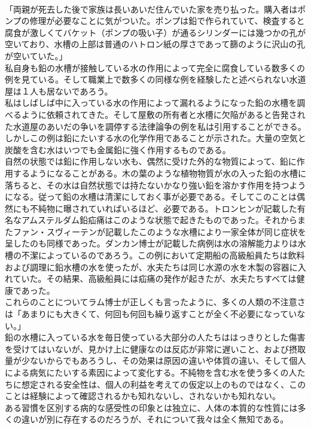 \documentclass[8pt]{extreport}
\begin{document}
\begin{CJK}{UTF8}{min}
\\	「両親が死去した後で家族は長いあいだ住んでいた家を売り払った。購入者はポンプの修理が必要なことに気がついた。ポンプは鉛で作られていて、検査すると腐食が激しくてバケット（ポンプの吸い子）が通るシリンダーには幾つかの孔が空いており、水槽の上部は普通のハトロン紙の厚さであって篩のように沢山の孔が空いていた。」
\\	私自身も鉛の水槽が接触している水の作用によって完全に腐食している数多くの例を見ている。そして職業上で数多くの同様な例を経験したと述べられない水道屋は１人も居ないであろう。
\\	私はしばしば中に入っている水の作用によって漏れるようになった鉛の水槽を調べるように依頼されてきた。そして屋敷の所有者と水槽に欠陥があると告発された水道屋のあいだの争いを調停する法律論争の例を私は引用することができる。しかしこの例は鉛にたいする水の化学作用であることが示された。大量の空気と炭酸を含む水はいつでも金属鉛に強く作用するものである。
\\	自然の状態では鉛に作用しない水も、偶然に受けた外的な物質によって、鉛に作用するようになることがある。木の葉のような植物物質が水の入った鉛の水槽に落ちると、その水は自然状態では持たないかなり強い鉛を溶かす作用を持つようになる。従って鉛の水槽は清潔にしておく事が必要である。そしてこのことは偶然にも不純物に曝されていればいるほど、必要である。トロンヒンが記載した有名なアムステルダム鉛疝痛はこのような状態で起きたものであった。それからまたファン・スヴィーテンが記載したこのような水槽により一家全体が同じ症状を呈したのも同様であった。ダンカン博士が記載した病例は水の溶解能力よりは水槽の不潔によっているのであろう。この例において定期船の高級船員たちは飲料および調理に鉛水槽の水を使ったが、水夫たちは同じ水源の水を木製の容器に入れていた。その結果、高級船員には疝痛の発作が起きたが、水夫たちすべては健康であった。
\\	これらのことについてラム博士が正しくも言ったように、多くの人類の不注意さは「あまりにも大きくて、何回も何回も繰り返すことが全く不必要になっていない。」
\\	鉛の水槽に入っている水を毎日使っている大部分の人たちははっきりとした傷害を受けてはいないが、見かけ上に健康なのは反応が非常に遅いこと、および摂取量が少ないからでもあろうし、その効果は原因の違いや体質の違い、そして個人による病気にたいする素因によって変化する。不純物を含む水を使う多くの人たちに想定される安全性は、個人の利益を考えての仮定以上のものではなく、このことは経験によって確認されるかも知れないし、されないかも知れない。
\\	ある習慣を区別する病的な感受性の印象とは独立に、人体の本質的な性質には多くの違いが別に存在するのだろうが、それについて我々は全く無知である。

\end{CJK}
\end{document}
